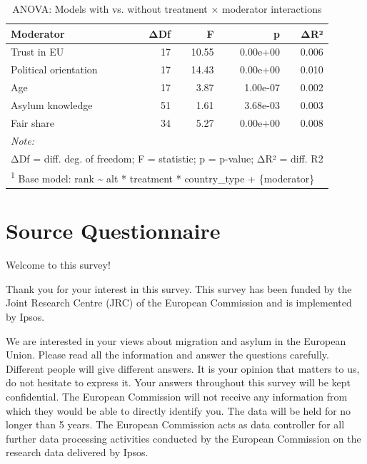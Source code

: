 \documentclass[
  12pt,
  a4paper,
]{article}
\begin{document}
\begin{table}
\centering
\caption{\label{tab:anova}ANOVA: Models with vs. without treatment × moderator interactions}
\centering
\begin{tabular}[t]{lrrrr}
\toprule
Moderator & ΔDf & F & p & ΔR²\\
\midrule
Trust in EU & 17 & 10.55 & 0.00e+00 & 0.006\\
Political orientation & 17 & 14.43 & 0.00e+00 & 0.010\\
Age & 17 & 3.87 & 1.00e-07 & 0.002\\
Asylum knowledge & 51 & 1.61 & 3.68e-03 & 0.003\\
Fair share & 34 & 5.27 & 0.00e+00 & 0.008\\
\bottomrule
\multicolumn{5}{l}{\rule{0pt}{1em}\textit{Note: }}\\
\multicolumn{5}{l}{\rule{0pt}{1em}ΔDf = diff. deg. of freedom; F = statistic; p = p-value; ΔR² = diff. R2}\\
\multicolumn{5}{l}{\rule{0pt}{1em}\textsuperscript{1} Base model: rank \textasciitilde{} alt * treatment * country\_type + \{moderator\}}\\
\end{tabular}
\end{table}

\clearpage

\section{Source Questionnaire}\label{source-questionnaire}

Welcome to this survey!

Thank you for your interest in this survey. This survey has been funded by the Joint Research Centre (JRC) of the European Commission and is implemented by Ipsos.

We are interested in your views about migration and asylum in the European Union. Please read all the information and answer the questions carefully. Different people will give different answers. It is your opinion that matters to us, do not hesitate to express it.
Your answers throughout this survey will be kept confidential. The European Commission will not receive any information from which they would be able to directly identify you. The data will be held for no longer than 5 years. The European Commission acts as data controller for all further data processing activities conducted by the European Commission on the research data delivered by Ipsos.
\end{document}
